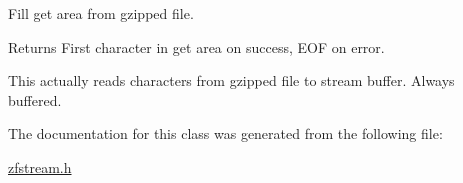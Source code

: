 Fill get area from gzipped file. 

\begin{DoxyReturn}{Returns}
First character in get area on success, E\+OF on error.
\end{DoxyReturn}
This actually reads characters from gzipped file to stream buffer. Always buffered. 

The documentation for this class was generated from the following file\+:\begin{DoxyCompactItemize}
\item 
\hyperlink{zfstream_8h}{zfstream.\+h}\end{DoxyCompactItemize}
